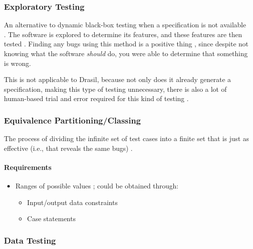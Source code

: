 \subsubsection{Exploratory Testing \cite[p.~65]{patton_software_2006}}

An alternative to dynamic black-box testing when a specification is not
available \cite[p.~65]{patton_software_2006}. The software is explored to
determine its features, and these features are then tested
\cite[p.~65]{patton_software_2006}. Finding any bugs using this method is a
positive thing \cite[p.~65]{patton_software_2006}, since despite not knowing
what the software \emph{should} do, you were able to determine that something
is wrong.

This is not applicable to Drasil, because not only does it already generate a
specification, making this type of testing unnecessary, there is also a lot of
human-based trial and error required for this kind of testing
\cite{june_11_meeting}.

\subsubsection{Equivalence Partitioning/Classing \cite[p.~67-69]{patton_software_2006}}

The process of dividing the infinite set of test cases into a finite set that is
just as effective (i.e., that reveals the same bugs) \cite[p.~67]{patton_software_2006}.

\paragraph{Requirements}
\begin{itemize}
      \item Ranges of possible values \cite[p.~67]{patton_software_2006};
            could be obtained through:
            \begin{itemize}
                  \item Input/output data constraints
                  \item Case statements
            \end{itemize}
\end{itemize}

\subsubsection{Data Testing \cite[p.~70-79]{patton_software_2006}}

